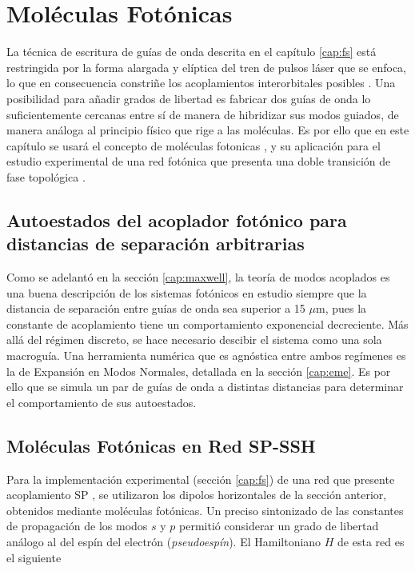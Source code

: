 \chapter{Moléculas Fotónicas}

La técnica de escritura de guías de onda descrita en el capítulo \ref{cap:fs} está restringida por la forma alargada y elíptica del tren de pulsos láser que se enfoca, lo que en consecuencia constriñe los acoplamientos interorbitales posibles \citep{interorbital}. Una posibilidad para añadir grados de libertad es fabricar dos guías de onda lo suficientemente cercanas entre sí de manera de hibridizar sus modos guiados, de manera análoga al principio físico que rige a las moléculas. Es por ello que en este capítulo se usará el concepto de moléculas fotonicas \citep{molecules}, y su aplicación para el estudio experimental de una red fotónica que presenta una doble transición de fase topológica \citep{SPSSH}.

\section{Autoestados del acoplador fotónico para distancias de separación arbitrarias}

Como se adelantó en la sección \ref{cap:maxwell}, la teoría de modos acoplados es una buena descripción de los sistemas fotónicos en estudio siempre que la distancia de separación entre guías de onda sea superior a 15 $\mu$m, pues la constante de acoplamiento tiene un comportamiento exponencial decreciente. Más allá del régimen discreto, se hace necesario descibir el sistema como una sola macroguía. Una herramienta numérica que es agnóstica entre ambos regímenes es la de Expansión en Modos Normales, detallada en la sección \ref{cap:eme}. Es por ello que se simula un par de guías de onda a distintas distancias para determinar el comportamiento de sus autoestados. 

\section{Moléculas Fotónicas en Red SP-SSH}

Para la implementación experimental (sección \ref{cap:fs}) de una red que presente acoplamiento SP \citep{interorbital, SPSSH}, se utilizaron los dipolos horizontales de la sección anterior, obtenidos mediante moléculas fotónicas. Un preciso sintonizado de las constantes de propagación de los modos $s$ y $p$ permitió considerar un grado de libertad análogo al del espín del electrón (\textit{pseudoespín}). El Hamiltoniano $H$ de esta red \citep{SPSSH,toporusos}  es el siguiente

